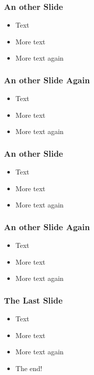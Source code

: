 \documentclass{beamer}
\begin{document}

\begin{frame} 
\frametitle{An other Slide}
  \begin{itemize}
  \item Text
  \item More text
  \item More text again
  \end{itemize}
\end{frame}


\begin{frame} 
\frametitle{An other Slide Again}
  \begin{itemize}
  \item Text
  \item More text
  \item More text again
  \end{itemize}
\end{frame}


\begin{frame} 
\frametitle{An other Slide}
  \begin{itemize}
  \item Text
  \item More text
  \item More text again
  \end{itemize}
\end{frame}


\begin{frame} 
\frametitle{An other Slide Again}
  \begin{itemize}
  \item Text
  \item More text
  \item More text again
  \end{itemize}
\end{frame}


\begin{frame} 
\frametitle{The Last Slide}
  \begin{itemize}
  \item Text
  \item More text
  \item More text again
  \item The end!
  \end{itemize}
\end{frame}

\end{document}
